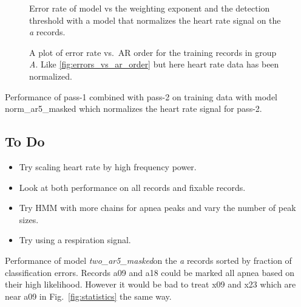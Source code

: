 \documentclass[12pt]{article}
\newcommand{\BestModel}{\emph{two\_ar5\_masked}}
\begin{document}
\begin{figure}
  \centering
    \caption{Error rate of model vs the weighting exponent and the
      detection threshold with a model that normalizes the heart rate
      signal on the \emph{a} records.}
  \label{fig:norm_power_threshold}
\end{figure}

\begin{figure}
  \centering
    \caption{A plot of error rate vs.\ AR order for the training
      records in group \emph{A}.  Like \ref{fig:errors_vs_ar_order}
      but here heart rate data has been normalized.}
  \label{fig:norm_errors_vs_ar_order}
\end{figure}

\begin{table*}
  \centering
  
  \caption[Performance]{Performance of pass-1 combined with pass-2 on
    training data with model norm\_ar5\_masked which normalizes the
    heart rate signal for pass-2.}
  \label{tab:norm_score}
\end{table*}

\subsection{To Do}

\begin{itemize}
\item Try scaling heart rate by high frequency power.
\item Look at both performance on all records and fixable records.
\item Try HMM with more chains for apnea peaks and vary the number of
  peak sizes.
\item Try using a respiration signal.
\end{itemize}

\begin{table*}
  \centering
  
  \caption[Performance]{Performance of model \BestModel on the
    \emph{a} records sorted by fraction of classification errors.
    Records a09 and a18 could be marked all apnea based on their high
    likelihood.  However it would be bad to treat x09 and x23 which
    are near a09 in Fig.~\ref{fig:statistics} the same way.}
  \label{tab:pass2performance}
\end{table*}
\end{document}
